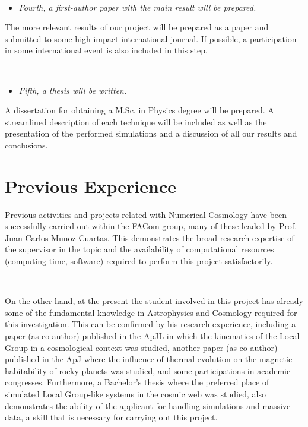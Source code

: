 \documentclass[a4,useAMS,usenatbib,usegraphicx,12pt]{article}
\begin{document}
\

\begin{itemize}
\item[\checkmark] \textit{Fourth, a first-author paper with the main result will
be prepared.}
\end{itemize}


The more relevant results of our project will be prepared as a paper and 
submitted to some high impact international journal. If possible, a participation
in some international event is also included in this step.

\

\begin{itemize}
\item[\checkmark] \textit{Fifth, a thesis will be written.}
\end{itemize}


A dissertation for obtaining a M.Sc. in Physics degree will be prepared. A
streamlined description of each technique will be included as well as the 
presentation of the performed simulations and a discussion of all our results
and conclusions.


\section{Previous Experience}
Previous activities and projects related with Numerical Cosmology have been 
successfully carried out within the FACom group, many of these leaded by Prof. 
Juan Carlos Munoz-Cuartas. This demonstrates the broad research expertise of 
the supervisor in the topic and the availability of computational resources 
(computing time, software) required to perform this project satisfactorily.

\

On the other hand, at the present the student involved in this project has 
already some of the fundamental knowledge in Astrophysics and Cosmology required 
for this investigation. This can be confirmed by his research experience, 
including a paper (as co-author) published in the ApJL in which the kinematics 
of the Local Group in a cosmological context was studied, another paper (as 
co-author) published in the ApJ where the influence of thermal evolution on the 
magnetic habitability of rocky planets was studied, and some participations in 
academic congresses. Furthermore, a Bachelor’s thesis where the preferred place 
of simulated Local Group-like systems in the cosmic web was studied, also 
demonstrates the ability of the applicant for handling simulations and massive 
data, a skill that is necessary for carrying out this project.
\end{document}

